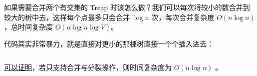 如果需要合并两个有交集的 Treap 时该怎么做？我们可以每次将较小的数合并到较大的树中去，这样每个点最多只会合并 $\log n$ 次，每次合并复杂度 $O(n\log n)$，总时间复杂度 $O(n\log n\log V)$。

代码其实非常暴力，就是直接对更小的那棵树直接一个个插入进去：

\inputminted{cpp}{src/data structure/treap-merge.cpp}

\href{https://codeforces.com/blog/entry/108601}{可以证明}，若只支持合并与分裂操作，则时间复杂度为 $O(n\log n)$ 。